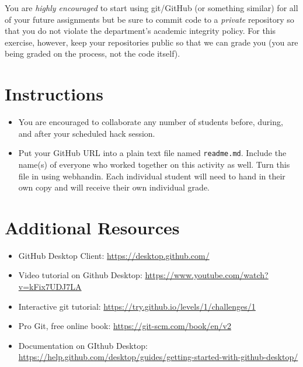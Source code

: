 \documentclass[12pt]{scrartcl}
\begin{document}
You are \emph{highly encouraged} to start using git/GitHub (or 
something similar) for all of your future assignments 
but be sure to commit code to a \emph{private} repository 
so that you do not violate the department's academic integrity 
policy.  For this exercise, however, keep your repositories 
public so that we can grade you (you are
being graded on the process, not the code itself). 

\section*{Instructions}

\begin{itemize}
  \item You are encouraged to collaborate any number of students 
  before, during, and after your scheduled hack session.    
  \item Put your GitHub URL into a plain text file named 
  \texttt{readme.md}.  Include the name(s) of everyone 
  who worked together on this activity as well.  Turn this file
  in using webhandin.  Each individual student will need
  to hand in their own copy and will receive their own individual
  grade.
\end{itemize}
  
\section*{Additional Resources}

\begin{itemize} 
  \item GitHub Desktop Client: \url{https://desktop.github.com/} 
  \item Video tutorial on Github Desktop: \url{https://www.youtube.com/watch?v=kFix7UDJ7LA}
  \item Interactive git tutorial: \url{https://try.github.io/levels/1/challenges/1}
  \item Pro Git, free online book: \url{https://git-scm.com/book/en/v2}
  \item Documentation on GIthub Desktop: \url{https://help.github.com/desktop/guides/getting-started-with-github-desktop/}
\end{itemize}


  
\end{document}
